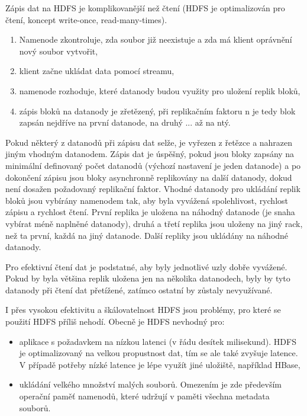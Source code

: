 \documentclass[11pt,twoside,a4paper]{book}
\begin{document}
		Zápis dat na HDFS je komplikovanější než čtení (HDFS je optimalizován pro čtení, koncept write-once, read-many-times). 
\begin{enumerate}
\item Namenode zkontroluje, zda soubor již neexistuje a zda má klient oprávnění nový soubor vytvořit,
\item klient začne ukládat data pomocí streamu,
\item namenode rozhoduje, které datanody budou využity pro uložení replik bloků,
\item zápis bloků na datanody je zřetězený, při replikačním faktoru n je tedy blok zapsán nejdříve na první datanode, na druhý ... až na ntý.
\end{enumerate}
		Pokud některý z datanodů při zápisu dat selže, je vyřezen z řetězce a nahrazen jiným vhodným datanodem. Zápis dat je úspěšný, pokud jsou bloky zapsány na minimální definovaný počet datanodů (výchozí nastavení je jeden datanode) a po dokončení zápisu jsou bloky asynchronně replikovány na další datanody, dokud není dosažen požadovaný replikační faktor.  
		Vhodné datanody pro ukládání replik bloků jsou vybírány namenodem tak, aby byla vyvážená spolehlivost, rychlost zápisu a rychlost čtení. První replika je uložena na náhodný datanode (je snaha vybírat méně naplněné datanody), druhá a třetí replika jsou uloženy na jiný rack, než ta první, každá na jiný datanode. Další repliky jsou ukládány na náhodné datanody.   

		Pro efektivní čtení dat je podstatné, aby byly jednotlivé uzly dobře vyvážené. Pokud by byla většina replik uložena jen na několika datanodech, byly by tyto datanody při čtení dat přetížené, zatímco ostatní by zůstaly nevyužívané.
		
                I přes vysokou efektivitu a škálovatelnost HDFS jsou problémy, pro které se použití HDFS příliš nehodí. Obecně je HDFS nevhodný pro: 
\begin{itemize}
\item aplikace s požadavkem na nízkou latenci (v řádu desítek milisekund). HDFS je optimalizovaný na velkou propustnost dat, tím se ale také zvyšuje latence. V případě potřeby nízké latence je lépe využít jiné uložiště, například HBase,
\item ukládání velkého množství malých souborů. Omezením je zde především operační paměť namenodů, které udržují v paměti všechna metadata souborů.
\end{itemize}
\end{document}
